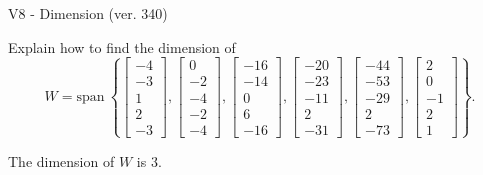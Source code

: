 \begin{exercise}
  \begin{exerciseTitle}V8 - Dimension (ver. 340)\end{exerciseTitle}
  \begin{exerciseStatement}
    Explain how to find the dimension of 
\[W=\mathrm{span}\ \left\{\left[\begin{array}{r}
-4 \\
-3 \\
1 \\
2 \\
-3
\end{array}\right] , \left[\begin{array}{r}
0 \\
-2 \\
-4 \\
-2 \\
-4
\end{array}\right] , \left[\begin{array}{r}
-16 \\
-14 \\
0 \\
6 \\
-16
\end{array}\right] , \left[\begin{array}{r}
-20 \\
-23 \\
-11 \\
2 \\
-31
\end{array}\right] , \left[\begin{array}{r}
-44 \\
-53 \\
-29 \\
2 \\
-73
\end{array}\right] , \left[\begin{array}{r}
2 \\
0 \\
-1 \\
2 \\
1
\end{array}\right]\right\}.\]



  \end{exerciseStatement}
  \begin{exerciseAnswer}
   The dimension of \(W\) is  \(3\).
  


  \end{exerciseAnswer}
\end{exercise}